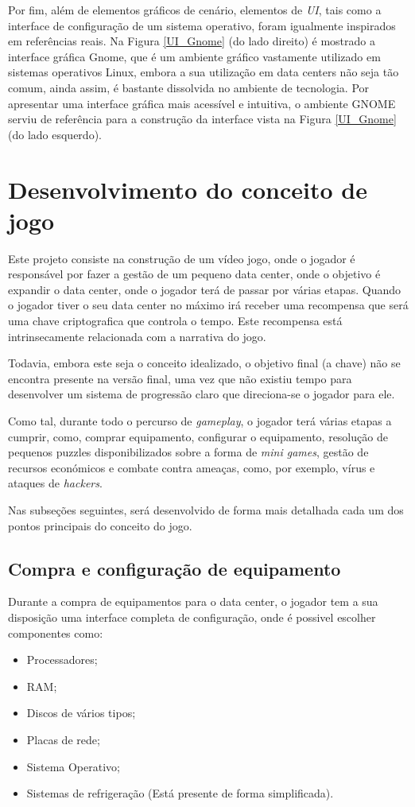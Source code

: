 Por fim, além de elementos gráficos de cenário, elementos de \textit{UI}, tais como a interface de configuração de um sistema operativo, foram igualmente inspirados em referências reais.
Na Figura \ref{UI_Gnome} (do lado direito) é mostrado a interface gráfica Gnome, que é um ambiente gráfico vastamente utilizado em sistemas operativos Linux, embora a sua utilização em data centers não seja tão comum, ainda assim, é bastante dissolvida no ambiente de tecnologia.
Por apresentar uma interface gráfica mais acessível e intuitiva, o ambiente GNOME serviu de referência para a construção da interface vista na Figura \ref{UI_Gnome} (do lado esquerdo).

\section{Desenvolvimento do conceito de jogo}

Este projeto consiste na construção de um vídeo jogo, onde o jogador é responsável
por fazer a gestão de um pequeno data center, onde o objetivo é expandir o data center, onde o jogador terá de passar por várias etapas. Quando o jogador tiver o seu data center no máximo irá receber uma recompensa que será uma chave criptografica que controla o tempo. Este recompensa está intrinsecamente relacionada com a narrativa do jogo.  

Todavia, embora este seja o conceito idealizado, o objetivo final (a chave) não se encontra presente na versão final, uma vez que não existiu tempo para desenvolver um sistema de progressão claro que direciona-se o jogador para ele.

Como tal, durante todo o percurso de \textit{gameplay}, o jogador terá várias etapas a cumprir,
como, comprar equipamento, configurar o equipamento, resolução de pequenos
puzzles disponibilizados sobre a forma de \textit{mini games}, gestão de recursos económicos e 
combate contra ameaças, como, por exemplo, vírus e ataques de \textit{hackers}.

Nas subseções seguintes, será desenvolvido de forma mais detalhada cada um dos pontos
principais do conceito do jogo.

\subsection{Compra e configuração de equipamento}

Durante a compra de equipamentos para o data center, o jogador tem a sua disposição uma interface completa de
configuração, onde é possivel escolher componentes como:
\begin{itemize}
    \item Processadores;
    \item RAM;
    \item Discos de vários tipos;
    \item Placas de rede;
    \item Sistema Operativo;
    \item Sistemas de refrigeração (Está presente de forma simplificada).
\end{itemize}

